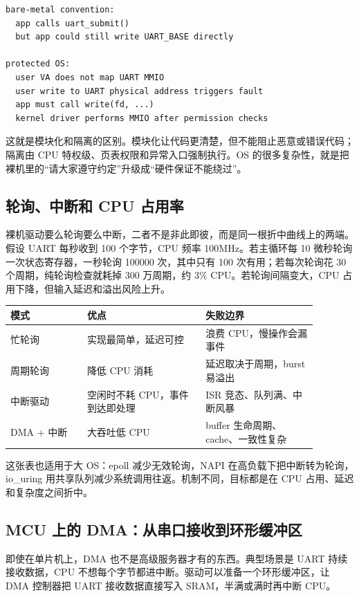 \begin{lstlisting}
bare-metal convention:
  app calls uart_submit()
  but app could still write UART_BASE directly

protected OS:
  user VA does not map UART MMIO
  user write to UART physical address triggers fault
  app must call write(fd, ...)
  kernel driver performs MMIO after permission checks
\end{lstlisting}

这就是模块化和隔离的区别。模块化让代码更清楚，但不能阻止恶意或错误代码；隔离由 CPU 特权级、页表权限和异常入口强制执行。OS 的很多复杂性，就是把裸机里的“请大家遵守约定”升级成“硬件保证不能绕过”。

\subsection{轮询、中断和 CPU 占用率}

裸机驱动要么轮询要么中断，二者不是非此即彼，而是同一根折中曲线上的两端。假设 UART 每秒收到 100 个字节，CPU 频率 100MHz。若主循环每 10 微秒轮询一次状态寄存器，一秒轮询 100000 次，其中只有 100 次有用；若每次轮询花 30 个周期，纯轮询检查就耗掉 300 万周期，约 3\% CPU。若轮询间隔变大，CPU 占用下降，但输入延迟和溢出风险上升。

\begin{longtable}{p{0.22\linewidth}p{0.34\linewidth}p{0.32\linewidth}}
\toprule
模式 & 优点 & 失败边界 \\
\midrule
忙轮询 & 实现最简单，延迟可控 & 浪费 CPU，慢操作会漏事件 \\
周期轮询 & 降低 CPU 消耗 & 延迟取决于周期，burst 易溢出 \\
中断驱动 & 空闲时不耗 CPU，事件到达即处理 & ISR 竞态、队列满、中断风暴 \\
DMA + 中断 & 大吞吐低 CPU & buffer 生命周期、cache、一致性复杂 \\
\bottomrule
\end{longtable}

这张表也适用于大 OS：epoll 减少无效轮询，NAPI 在高负载下把中断转为轮询，io\_uring 用共享队列减少系统调用往返。机制不同，目标都是在 CPU 占用、延迟和复杂度之间折中。

\subsection{MCU 上的 DMA：从串口接收到环形缓冲区}

即使在单片机上，DMA 也不是高级服务器才有的东西。典型场景是 UART 持续接收数据，CPU 不想每个字节都进中断。驱动可以准备一个环形缓冲区，让 DMA 控制器把 UART 接收数据直接写入 SRAM，半满或满时再中断 CPU。

